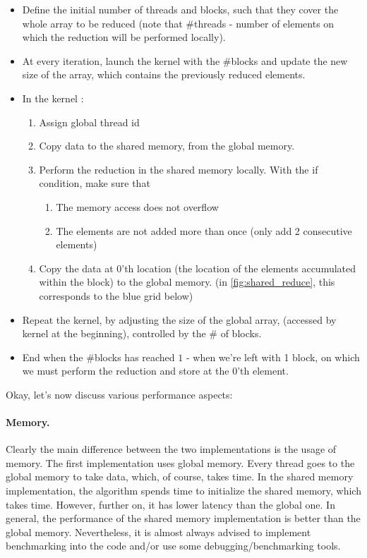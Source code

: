  \begin{itemize}
   \setlength\itemsep{-0.5em}
    \item Define the initial number of threads and blocks, such that they cover the whole 
    array to be reduced (note that \#threads - number of elements on which the reduction will be performed locally).
    \item At every iteration, launch the kernel with the \#blocks and update the new size of the array, which 
    contains the previously reduced elements. 
    \item In the kernel : \begin{enumerate}
                           \setlength\itemsep{-0.2em}
                        \item Assign global thread id
                        \item Copy data to the shared memory, from the global memory.
                        \item Perform the reduction in the shared memory locally. With the if condition, make sure that 
                        \begin{enumerate}
                           \setlength\itemsep{-0.2em}
                           \item The memory access does not overflow
                           \item The elements are not added more than once (only add 2 consecutive elements)
                        \end{enumerate}
                        \item Copy the data at 0'th location (the location of the elements accumulated within the block) to the global memory.
                        (in \autoref{fig:shared_reduce}, this corresponds to the blue grid below)
                        
                        \end{enumerate} 
   \item Repeat the kernel, by adjusting the size of the global array, (accessed by kernel at the beginning), 
   controlled by the \# of blocks. 
   \item End when the \#blocks has reached $1$ - when we're left with 1 block, on which we must 
   perform the reduction and store at the 0'th element.
\end{itemize}

Okay, let's now discuss various performance aspects:
\paragraph*{Memory.}Clearly the main difference between the two implementations is 
the usage of memory. The first implementation uses global memory. Every thread goes to 
the global memory to take data, which, of course, takes time. In the shared memory implementation,
the algorithm spends time to initialize the shared memory, which takes time. However, further on, it has lower latency than 
the global one. In general, the performance of the shared memory implementation is better than the global memory. 
Nevertheless, it is almost always advised to implement benchmarking into the code and/or use some 
debugging/benchmarking tools.
